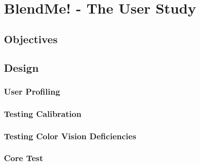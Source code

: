 
\section{BlendMe! - The User Study}
\label{sec:blendme}

\subsection{Objectives}

\subsection{Design}

\subsubsection{User Profiling}

\subsubsection{Testing Calibration}

\subsubsection{Testing Color Vision Deficiencies}

\subsubsection{Core Test}
